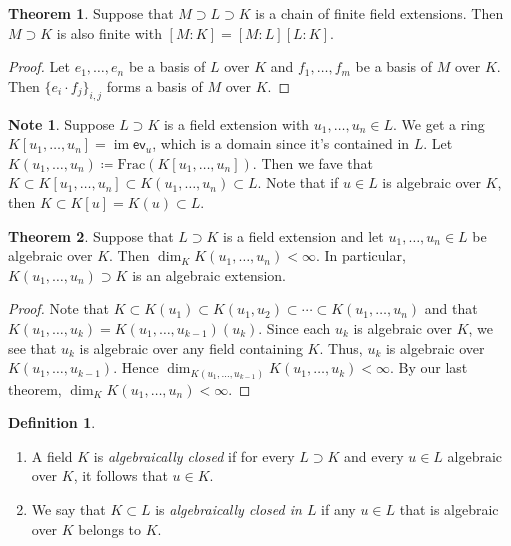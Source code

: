 \documentclass[10pt,letterpaper,cm]{nupset}
\theoremstyle{definition}
\newtheorem*{definition}{Definition}
\newtheorem{note}{Note}
\newtheorem{theorem}{Theorem}
\newcommand{\1}{\mathbf{1}}
\newcommand{\0}{\vec 0}
\DeclareMathOperator{\im}{im}
\begin{document}
\begin{theorem}
Suppose that $M \supset L \supset K$ is a chain of finite field extensions. Then $M \supset K$ is also finite with $[M:K] = [M:L][L:K]$.
\end{theorem}
\begin{proof}
Let $e_1, \ldots, e_n$ be a basis of $L$ over $K$ and $f_1, \ldots, f_m$ be a basis of $M$ over $K$. Then $\{e_i\cdot f_j\}_{i,j}$ forms a basis of $M$ over $K$.
\end{proof}

\begin{note}
Suppose $L \supset K$ is a field extension with $u_1, \ldots, u_n \in L$. We get a ring $K[u_1, \ldots, u_n]= \im{\mathsf{ev}_u}$, which is a domain since it's contained in $L$. Let $K(u_1, \ldots, u_n) \coloneqq  \text{Frac}(K[u_1, \ldots, u_n])$. Then we fave that $K \subset K[u_1, \ldots, u_n] \subset K(u_1, \ldots, u_n) \subset L$. Note that if $u\in L$ is algebraic over $K$, then $K \subset K[u] = K(u) \subset L$. 
\end{note}

\begin{theorem}
Suppose that $L \supset K$ is a field extension and let $u_1, \ldots, u_n \in L$ be algebraic over $K$. Then $\dim_K{K(u_1, \ldots, u_n)} < \infty$. In particular, $K(u_1, \ldots, u_n) \supset K$ is an algebraic extension. 
\end{theorem}
\begin{proof}
Note that $K \subset K(u_1) \subset K(u_1, u_2) \subset \cdots \subset K(u_1, \ldots, u_n)$ and that $K(u_1, \ldots, u_k) = K(u_1, \ldots, u_{k-1})(u_k)$.  Since each $u_k$ is algebraic over $K$, we see that $u_k$ is algebraic over any field containing $K$. Thus, $u_k$ is algebraic over $K(u_1, \ldots, u_{k-1})$. Hence $\dim_{K(u_1, \ldots, u_{k-1})}{K(u_1, \ldots, u_k)} < \infty$. By our last theorem, $\dim_K{K(u_1, \ldots, u_n)} <\infty$.
\end{proof}

\begin{definition} $ $
\begin{enumerate}
\item A field $K$ is \textit{algebraically closed} if for every $L \supset K$ and every  $u\in L$ algebraic  over $K$, it follows that $u\in K$. 
\item We say that $K\subset L$ is \textit{algebraically closed in $L$} if any $u\in L$ that is algebraic over $K$ belongs to $K$. 
\end{enumerate}
\end{definition}
\end{document}
